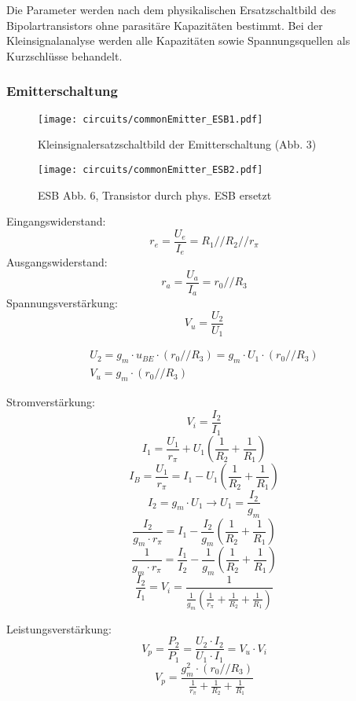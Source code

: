 Die Parameter werden nach dem physikalischen Ersatzschaltbild des
Bipolartransistors ohne parasitäre Kapazitäten bestimmt. Bei der
Kleinsignalanalyse werden alle Kapazitäten sowie Spannungsquellen als
Kurzschlüsse behandelt.

\subsubsection{Emitterschaltung}

\begin{figure}[H]
  \begin{center}
    \texttt{[image: circuits/commonEmitter\_ESB1.pdf]}
  \end{center}
  \caption{Kleinsignalersatzschaltbild der Emitterschaltung (Abb. 3)}
\end{figure}

\begin{figure}[H]
  \begin{center}
    \texttt{[image: circuits/commonEmitter\_ESB2.pdf]}
  \end{center}
  \caption{ESB Abb. 6, Transistor durch phys. ESB ersetzt}
\end{figure}

\noindent Eingangswiderstand:
\[r_e = \frac{U_e}{I_e} = R_1 // R_2 // r_\pi\]
\noindent Ausgangswiderstand:
\[r_a = \frac{U_a}{I_a} = r_0 // R_3 \]
\noindent Spannungsverstärkung:
\[V_u = \frac{U_2}{U_1}\]

\begin{gather*}
  U_2 = g_m \cdot u_{BE} \cdot (r_0 // R_3) = g_m \cdot U_1 \cdot (r_0 // R_3)\\
  V_u = g_m \cdot (r_0 // R_3)
\end{gather*}

\noindent Stromverstärkung:
\[V_i = \frac{I_2}{I_1}\]
\[I_1 = \frac{U_1}{r_\pi} + U_1 (\frac{1}{R_2} + \frac{1}{R_1})\]
\[I_B = \frac{U_1}{r_\pi} = I_1 - U_1 (\frac{1}{R_2} + \frac{1}{R_1})\]
\[I_2 = g_m \cdot U_1 \rightarrow U_1 = \frac{I_2}{g_m}\]
\[ \frac{I_2}{g_m \cdot r_\pi}  = I_1 - \frac{I_2}{g_m} (\frac{1}{R_2} + \frac{1}{R_1}) \]
\[ \frac{1}{g_m \cdot r_\pi}  = \frac{I_1}{I_2} - \frac{1}{g_m} (\frac{1}{R_2} + \frac{1}{R_1}) \]
\[\frac{I_2}{I_1} = V_i = \frac{1}{ \frac{1}{g_m} (\frac{1}{r_\pi} +
    \frac{1}{R_2} + \frac{1}{R_1}) }\]

\noindent Leistungsverstärkung:
\[V_p = \frac{P_2}{P_1} = \frac{U_2 \cdot I_2}{U_1 \cdot I_1} = V_u \cdot V_i\]
\[V_p = \frac{g_m^2 \cdot (r_0 // R_3)}{\frac{1}{r_{\pi}} + \frac{1}{R_2} + \frac{1}{R_1}}\]

